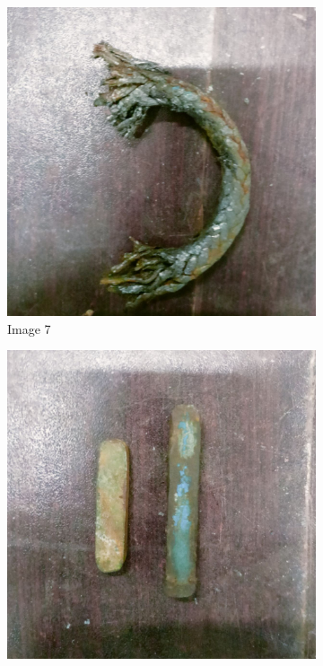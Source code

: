 \documentclass[12pt]{article}
\begin{document}
\begin{figure}
  \begin{subfigure}{0.3\textwidth}
      \includegraphics[width=\linewidth]{img/07.jpg}
      \caption{Image 7}
  \end{subfigure}
  \hfill
  \begin{subfigure}{0.3\textwidth}
      \includegraphics[width=\linewidth]{img/08.jpg}

\end{subfigure}
\end{figure}
\end{document}
